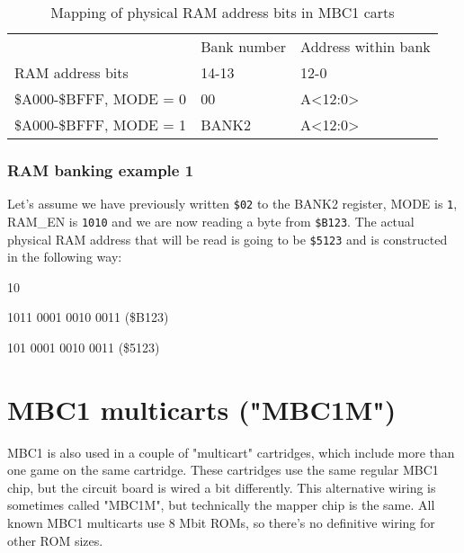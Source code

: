\begin{table}[H]
  \caption{Mapping of physical RAM address bits in MBC1 carts}
  \ttfamily
  \begin{tabu} to \textwidth {|X[10,l]|X[5,c]|X[13,c]|}
    \everyrow{\hline}
    \hline
    \rowfont{\rmfamily}
    & Bank number & Address within bank \\
    \rowfont{\rmfamily}
    RAM address bits & 14-13 & 12-0 \\
    \$A000-\$BFFF, MODE = 0 & 00 & A<12:0> \\
    \$A000-\$BFFF, MODE = 1 & BANK2 & A<12:0> \\
    \hline
  \end{tabu}
\end{table}

\subsubsection{RAM banking example 1}

Let's assume we have previously written \texttt{\$02} to the BANK2 register, MODE
is \texttt{1}, RAM\_EN is \texttt{1010} and we are now reading a byte from
\texttt{\$B123}. The actual physical RAM address that will be read is going to
be \texttt{\$5123} and is constructed in the following way:

\begin{description}[leftmargin=15em,style=nextline]
  \item[Value of the BANK2 register]
  {
    \ttfamily
    \colorbox{red!30}{10}
  }
  \item[Address being read]
  {
    \ttfamily
    \colorbox{gray!10}{101}\colorbox{green!30}{1 0001 0010 0011} (\$B123)
  }
  \item[Actual physical RAM address]
  {
    \ttfamily
    \colorbox{red!30}{10}\colorbox{green!30}{1 0001 0010 0011} (\$5123)
  }
\end{description}

\section{MBC1 multicarts ("MBC1M")}

MBC1 is also used in a couple of "multicart" cartridges, which include more
than one game on the same cartridge. These cartridges use the same regular MBC1
chip, but the circuit board is wired a bit differently. This alternative wiring
is sometimes called "MBC1M", but technically the mapper chip is the same. All
known MBC1 multicarts use 8 Mbit ROMs, so there's no definitive wiring for
other ROM sizes.

